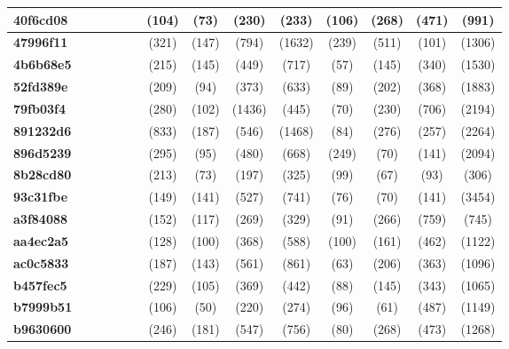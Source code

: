 \begin{table*}[htb]
\begin{tabular}{l|c|cccc|ccccc|ccc}
\midrule
\textbf{40f6cd08} & \X  & \X  & \X & \X  & \X  & \X (104) & \X (73) & \X (230) & \X (233) & \X (106) & \X (268)& \X (471)& \X (991)\\
\midrule
\textbf{47996f11} & \X  & \X  & \X & \X  & \X  & \X (321) & \X (147) & \X (794) & \X (1632) & \X (239) & \X (511) & \X (101) & \X (1306)\\
\midrule
\textbf{4b6b68e5} & \X  & \X  & \X & \X  & \X  & \X (215) & \X (145) & \X (449) & \X (717) & \X (57) & \X (145)& \X (340)& \X (1530)\\
\midrule
\textbf{52fd389e} & \C & \X  & \X & \X  & \X  & \X (209) & \X (94) & \X (373) & \X (633) & \X (89) & \X (202)& \X (368)& \C (1883)\\
\midrule
\textbf{79fb03f4} & \X  & \X  & \X & \X  & \X  & \X (280) & \X (102) & \X (1436) & \X (445) & \X (70) & \X (230)& \X (706)& \X (2194)\\
\midrule
\textbf{891232d6} & \C & \X  & \X & \X  & \X  & \X (833) & \X (187) & \X (546) & \X (1468) & \X (84) & \X (276)& \X (257)& \C (2264)\\
\midrule
\textbf{896d5239} & \X  & \X  & \X & \X  & \X  & \X (295) & \X (95) & \X (480) & \X (668) & \X (249) & \X (70)& \X (141)& \X (2094)\\
\midrule
\textbf{8b28cd80} & \X  & \X  & \X & \X  & \X  & \X (213) & \X (73) & \X (197) & \X (325)  & \X (99) & \X (67)& \X (93)& \X (306)\\
\midrule
\textbf{93c31fbe} & \X  & \X  & \X & \X  & \X  & \X (149) & \X (141) & \X (527) & \X (741) & \X (76) & \X (70)& \X (141)& \X (3454)\\
\midrule
\textbf{a3f84088} & \C & \C & \X & \X  & \X & \X (152) & \X (117) & \X (269) & \X (329) & \X (91) & \C(266)& \C (759)& \C (745)\\
\midrule
\textbf{aa4ec2a5} & \C & \X  & \X  & \X  & \X & \X (128) & \X (100) & \X (368) & \X (588) & \X (100) & \C (161)& \X (462)& \X (1122)\\
\midrule
\textbf{ac0c5833} & \X  & \X  & \X & \X & \X  & \X (187) & \X (143) & \X (561) & \X (861) & \X (63) & \X (206)& \X (363)& \X (1096)\\
\midrule
\textbf{b457fec5} & \C & \X & \X  & \X  & \X  & \X (229) & \X (105) & \X (369) & \X (442) & \X (88) & \C (145)& \X (343)& \C (1065)\\
\midrule
\textbf{b7999b51} & \C & \X & \C & \X  & \X & \X (106) & \X (50) & \X (220) & \X (274) & \X (96)  & \X (61) & \X (487)& \X (1149)\\
\midrule
\textbf{b9630600} & \X  & \X  & \X & \X  & \X  & \X (246) & \X (181) & \X (547) & \X (756) & \X (80) & \X (268) & \X (473)& \X (1268)\\

\end{tabular}
\end{table*}
